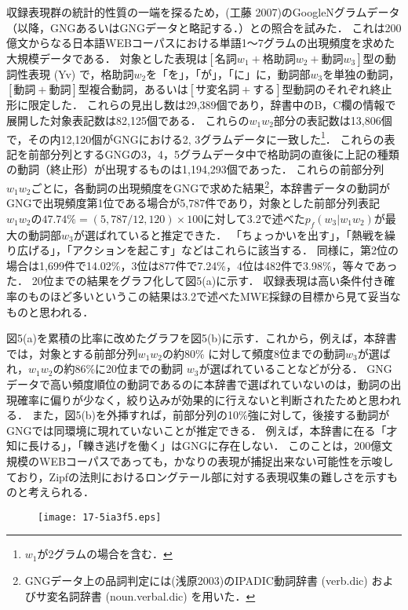 \documentclass[japanese]{jnlp_1.4}
\begin{document}
収録表現群の統計的性質の一端を探るため，(工藤 2007)のGoogleNグラムデータ（以降，GNGあるいはGNGデータと略記する．）との照合を試みた．
これは200億文からなる日本語WEBコーパスにおける単語1〜7グラムの出現頻度を求めた大規模データである．  対象とした表現は$[\text{名詞}w_{1}+\text{格助詞}w_{2}+\text{動詞}w_{3}]$型の動詞性表現 (Yv) で，格助詞$w_{2}$を「を」，「が」，「に」に，動詞部$w_{3}$を単独の動詞，$[\text{動詞}+\text{動詞}]$型複合動詞，あるいは$[\text{サ変名詞}+\text{する}]$型動詞のそれぞれ終止形に限定した．
これらの見出し数は29,389個であり，辞書中のB，C欄の情報で展開した対象表記数は82,125個である．
これらの$w_{1}w_{2}$部分の表記数は13,806個で，その内12,120個がGNGにおける2, 3グラムデータに一致した\footnote{$w_{1}$が2グラムの場合を含む．}．
これらの表記を前部分列とするGNGの3，4，5グラムデータ中で格助詞の直後に上記の種類の動詞（終止形）が出現するものは1,194,293個であった．
これらの前部分列$w_{1}w_{2}$ごとに，各動詞の出現頻度をGNGで求めた結果\footnote{GNGデータ上の品詞判定には(浅原2003)のIPADIC動詞辞書 (verb.dic) およびサ変名詞辞書 (noun.verbal.dic) を用いた．}，本辞書データの動詞がGNGで出現頻度第1位である場合が5,787件であり，対象とした前部分列表記$w_{1}w_{2}$の$47.74\%=(5,787/12,120)\times 100$に対して3.2で述べた$p_{f}(w_{3}|w_{1}w_{2})$が最大の動詞部$w_{3}$が選ばれていると推定できた．
「ちょっかいを出す」，「熱戦を繰り広げる」，「アクションを起こす」などはこれらに該当する．
同様に，第2位の場合は1,699件で14.02\%，3位は877件で7.24\%，4位は482件で3.98\%，等々であった．
20位までの結果をグラフ化して図5(a)に示す．
収録表現は高い条件付き確率のものほど多いというこの結果は3.2で述べたMWE採録の目標から見て妥当なものと思われる．

図5(a)を累積の比率に改めたグラフを図5(b)に示す．これから，例えば，本辞書では，対象とする前部分列$w_{1}w_{2}$の約80\%
に対して頻度8位までの動詞$w_{3}$が選ばれ，$w_{1}w_{2}$の約86\%に20位までの動詞
$w_{3}$が選ばれていることなどが分る．
GNGデータで高い頻度順位の動詞であるのに本辞書で選ばれていないのは，動詞の出現確率に偏りが少なく，絞り込みが効果的に行えないと判断されたためと思われる．
また，図5(b)を外挿すれば，前部分列の10\%強に対して，後接する動詞がGNGでは同環境に現れていないことが推定できる．
例えば，本辞書に在る「才知に長ける」，「轢き逃げを働く」はGNGに存在しない．
このことは，200億文規模のWEBコーパスであっても，かなりの表現が捕捉出来ない可能性を示唆しており，Zipfの法則におけるロングテール部に対する表現収集の難しさを示すものと考えられる．

\begin{figure}[t]
\begin{center}
\texttt{[image: 17-5ia3f5.eps]}
\end{center}
\label{fig5}
\vspace{-1\baselineskip}
\end{figure}
\end{document}
